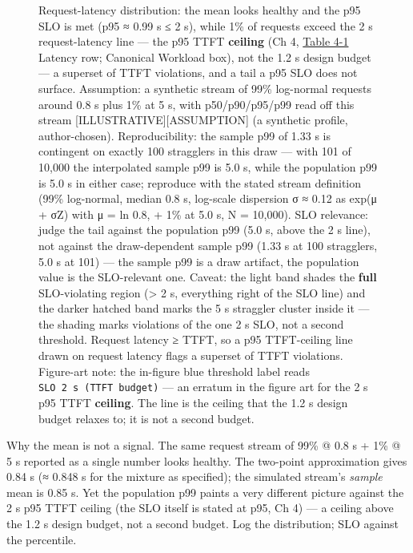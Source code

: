 \begin{figure}
\caption[Request-latency distribution]{Request-latency distribution: the mean looks healthy and the p95 SLO is met (p95 ≈ 0.99 s ≤ 2 s), while 1\% of requests exceed the 2 s request-latency line --- the p95 TTFT \textbf{ceiling} (Ch 4, \hyperref[tab:4.1]{Table 4-1} Latency row; Canonical Workload box), not the 1.2 s design budget --- a superset of TTFT violations, and a tail a p95 SLO does not surface. Assumption: a synthetic stream of 99\% log-normal requests around 0.8 s plus 1\% at 5 s, with p50/p90/p95/p99 read off this stream \mbox{{[}ILLUSTRATIVE{]}}\hspace{0pt}\mbox{{[}ASSUMPTION{]}} (a synthetic profile, author-chosen). Reproducibility: the sample p99 of 1.33 s is contingent on exactly 100 stragglers in this draw --- with 101 of 10,000 the interpolated sample p99 is 5.0 s, while the population p99 is 5.0 s in either case; reproduce with the stated stream definition (99\% log-normal, median 0.8 s, log-scale dispersion σ ≈ 0.12 as exp(μ + σZ) with μ = ln 0.8, + 1\% at 5.0 s, N = 10,000). SLO relevance: judge the tail against the population p99 (5.0 s, above the 2 s line), not against the draw-dependent sample p99 (1.33 s at 100 stragglers, 5.0 s at 101) --- the sample p99 is a draw artifact, the population value is the SLO-relevant one. Caveat: the light band shades the \textbf{full} SLO-violating region (\textgreater{} 2 s, everything right of the SLO line) and the darker hatched band marks the 5 s straggler cluster inside it --- the shading marks violations of the one 2 s SLO, not a second threshold. Request latency ≥ TTFT, so a p95 TTFT-ceiling line drawn on request latency flags a superset of TTFT violations. Figure-art note: the in-figure blue threshold label reads \texttt{SLO\ 2\ s\ (TTFT\ budget)} --- an erratum in the figure art for the 2 s p95 TTFT \textbf{ceiling}. The line is the ceiling that the 1.2 s design budget relaxes to; it is not a second budget.}

\label{fig:6.2}\end{figure}

Why the mean is not a signal. The same request stream of 99\% @ 0.8 s +
1\% @ 5 s reported as a single number looks healthy. The two-point
approximation gives 0.84 s (≈ 0.848 s for the mixture as specified); the
simulated stream's \emph{sample} mean is 0.85 s. Yet the population p99
paints a very different picture against the 2 s p95 TTFT ceiling (the
SLO itself is stated at p95, Ch 4) --- a ceiling above the 1.2 s design
budget, not a second budget. Log the distribution; SLO against the
percentile.

